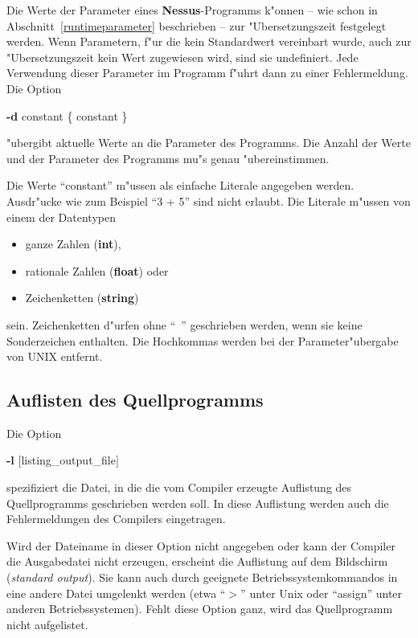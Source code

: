 Die Werte der Parameter eines {\bf Nessus}-Programms k"onnen -- wie
schon in Abschnitt~\ref{runtimeparameter} beschrieben -- zur
"Ubersetzungszeit festgelegt werden.  Wenn Parametern, f"ur die kein
Standardwert vereinbart wurde, auch zur "Ubersetzungszeit kein Wert
zugewiesen wird, sind sie undefiniert. Jede Verwendung dieser
Parameter im Programm f"uhrt dann zu einer Fehlermeldung. Die Option

\centerline{{\bf -d} constant \{ constant \}}

"ubergibt aktuelle  Werte an die Parameter des Programms. Die Anzahl
der Werte und der Parameter des Programms mu"s genau "ubereinstimmen.

Die Werte ``constant'' m"ussen als einfache Literale angegeben werden. Ausdr"ucke wie zum Beispiel ``3 + 5''
sind nicht erlaubt. Die Literale m"ussen von einem der Datentypen

\begin{itemize}
  \item ganze Zahlen ({\bf int}),
  \item rationale Zahlen ({\bf float}) oder
  \item Zeichenketten ({\bf string}) 
\end{itemize}

sein. Zeichenketten d"urfen ohne ``~''  geschrieben werden, wenn sie
keine Sonderzeichen enthalten. Die Hochkommas werden bei der
Parameter"ubergabe von UNIX entfernt. 



\subsection{Auflisten des Quellprogramms}

Die Option 

\centerline{{\bf -l} $[$listing\_output\_file$]$}

spezifiziert die Datei, in die die vom
Compiler erzeugte Auflistung des Quellprogramms geschrieben werden
soll. In diese Auflistung werden auch die Fehlermeldungen des
Compilers eingetragen.

Wird der Dateiname in dieser Option nicht
angegeben oder kann der Compiler die Ausgabedatei nicht erzeugen,
erscheint die 	Auflistung auf dem Bildschirm ({\it standard
output\/}). Sie kann auch durch geeignete Betriebssystemkommandos in
eine andere Datei umgelenkt werden (etwa ``$>$'' unter Unix oder
``assign'' unter anderen Betriebssystemen). Fehlt diese Option ganz,
wird das Quellprogramm nicht aufgelistet.


